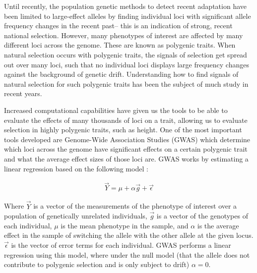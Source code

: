 \documentclass[a4paper,12pt]{article}
\begin{document}

Until recently, the population genetic methods to detect recent adaptation have been limited to
large-effect alleles by finding individual loci with significant
allele frequency changes in the recent past-- this is an indication of
strong, recent national selection. However, many phenotypes of interest
are affected by many different loci across the genome. These are known
as polygenic traits. When natural selection occurs with polygenic
traits, the signals of selection get spread out over many loci, such
that no individual loci displays large frequency changes against the
background of genetic drift.  Understanding
how to find signals of natural selection for such polygenic traits has been
the subject of much study in recent years.

Increased computational capabilities have given us the tools to be able to evaluate the effects
of many thousands of loci on a trait, allowing us to evaluate
selection in highly polygenic traits, such as height. One of the most
important tools developed are Genome-Wide Association Studies (GWAS)
which determine which loci across the genome have significant effects
on a certain polygenic trait \cite{gwasoverview} and what the average
effect sizes of those loci are. GWAS works by
estimating a linear regression based on the following model \cite{gwas}:

  \begin{align}
    \vec{Y} = \mu + \alpha \vec{g} + \vec{\epsilon}
  \end{align}

Where $\vec{Y}$ is a vector of the measurements of the phenotype of
interest over a population of genetically unrelated individuals,
$\vec{g}$ is a vector of the genotypes of each individual, $\mu$ is
the mean phenotype in the sample, and $\alpha$ is the average
effect in the sample of switching the allele with the
other allele at the given locus. $\vec{\epsilon}$ is the vector of
error terms for each individual. GWAS performs a linear regression
using this model, where under the null model (that the
allele does not contribute to polygenic selection and is only subject
to drift) $\alpha = 0$. 
\end{document}
